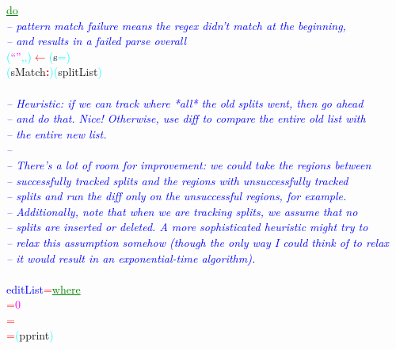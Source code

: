 \textcolor{green}{\underline{do}}\\\hstab \textcolor{blue}{{\it{}-- pattern match failure means the regex didn't match at the beginning,}}\\\hstab \textcolor{blue}{{\it{}-- and results in a failed parse overall}}\\\hstab \textcolor{cyan}{(}\textcolor{magenta}{``''}\textcolor{cyan}{,}\textcolor{cyan}{,}\textcolor{cyan}{)}\hsspace \textcolor{red}{\ensuremath{\leftarrow}}\hsspace \textcolor{cyan}{(}{\rm{}s}\hsspace \textcolor{cyan}{=\tilde{ }}\textcolor{cyan}{)}\\\hsspace \textcolor{cyan}{(}{\rm{}sMatch}\textcolor{red}{{\bf{}:}}\textcolor{cyan}{)}\hsspace \textcolor{cyan}{(}{\rm{}splitList}\textcolor{cyan}{)}\\\\\textcolor{blue}{{\it{}-- Heuristic: if we can track where *all* the old splits went, then go ahead}}\\\textcolor{blue}{{\it{}-- and do that. Nice! Otherwise, use diff to compare the entire old list with}}\\\textcolor{blue}{{\it{}-- the entire new list.}}\\\textcolor{blue}{{\it{}--}}\\\textcolor{blue}{{\it{}-- There's a lot of room for improvement: we could take the regions between}}\\\textcolor{blue}{{\it{}-- successfully tracked splits and the regions with unsuccessfully tracked}}\\\textcolor{blue}{{\it{}-- splits and run the diff only on the unsuccessful regions, for example.}}\\\textcolor{blue}{{\it{}-- Additionally, note that when we are tracking splits, we assume that no}}\\\textcolor{blue}{{\it{}-- splits are inserted or deleted. A more sophisticated heuristic might try to}}\\\textcolor{blue}{{\it{}-- relax this assumption somehow (though the only way I could think of to relax}}\\\textcolor{blue}{{\it{}-- it would result in an exponential-time algorithm).}}\\\\\textcolor{blue}{editList}\hsspace \textcolor{red}{=}\hsspace \textcolor{green}{\underline{where}}\\\hsspace \textcolor{red}{=}\hsspace \textcolor{magenta}{0}\\\hsspace \textcolor{red}{=}\hsspace {}\hsspace \hsspace \hsspace {}\\\hsspace \textcolor{red}{=}\hsspace \textcolor{cyan}{(}{\rm{}pprint}\textcolor{cyan}{)}\hsspace 